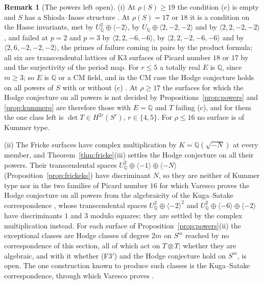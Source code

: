 \documentclass[11pt,reqno]{amsart}
\numberwithin{equation}{section}
\theoremstyle{plain}
\theoremstyle{definition}
\newtheorem{remark}[theorem]{Remark}
\newcommand{\QQ}{\mathbb{Q}}
\newcommand{\Fiii}{\texorpdfstring{\textup{(F3$'$)}}{(F3')}}
\begin{document}
\begin{remark}[The powers left open]\label{rem:detfrontier}
(i) At $\rho(S)\ge19$ the condition (c) is empty and $S$ has a Shioda--Inose structure \cite{Mor84}. At $\rho(S)=17$ or $18$ it is a condition on the Hasse invariants, met by $U_{\QQ}^{2}\oplus\langle-2\rangle$, by $U_{\QQ}\oplus\langle2,-2,-2\rangle$ and by $\langle2,2,-2,-2\rangle$, and failed at $p=2$ and $p=3$ by $\langle2,2,-6,-6\rangle$, by $\langle2,2,-2,-6,-6\rangle$ and by $\langle2,6,-2,-2,-2\rangle$, the primes of failure coming in pairs by the product formula; all six are transcendental lattices of K3 surfaces of Picard number $18$ or $17$ by \cite{Nik80} and the surjectivity of the period map. For $r\le5$ a totally real $E$ is $\QQ$, since $m\ge3$; so $E$ is $\QQ$ or a CM field, and in the CM case the Hodge conjecture holds on all powers of $S$ with or without (c) \cite{RM08}. At $\rho\ge17$ the surfaces for which the Hodge conjecture on all powers is not decided by Propositions~\ref{prop:powers} and \ref{prop:kummerq} are therefore those with $E=\QQ$ and $T$ failing (c), and for them the one class left is $\det T\in H^{2r}(S^{r})$, $r\in\{4,5\}$. For $\rho\le16$ no surface is of Kummer type.

(ii) The Fricke surfaces have complex multiplication by $K=\QQ(\sqrt{-N})$ at every member, and Theorem~\ref{thm:fricke}(iii) settles the Hodge conjecture on all their powers. Their transcendental spaces $U_{\QQ}^{2}\oplus\langle-1\rangle\oplus\langle-N\rangle$ (Proposition~\ref{prop:frickeks}) have discriminant $N$, so they are neither of Kummer type nor in the two families of Picard number $16$ for which Varesco proves the Hodge conjecture on all powers from the algebraicity of the Kuga--Satake correspondence \cite[Thm.~4.3, Exs.~4.4, 4.5]{Var25}, whose transcendental spaces $U_{\QQ}^{2}\oplus\langle-2\rangle^{2}$ and $U_{\QQ}^{2}\oplus\langle-6\rangle\oplus\langle-2\rangle$ have discriminants $1$ and $3$ modulo squares; they are settled by the complex multiplication instead. For each surface of Proposition~\ref{prop:powers}(ii) the exceptional classes are Hodge classes of degree $2m$ on $S^{m}$ reached by no correspondence of this section, all of which act on $T\otimes T$; whether they are algebraic, and with it whether \Fiii{} and the Hodge conjecture hold on $S^{m}$, is open. The one construction known to produce such classes is the Kuga--Satake correspondence, through which Varesco proves \cite[Thm.~4.3]{Var25}.
\end{remark}
\end{document}
